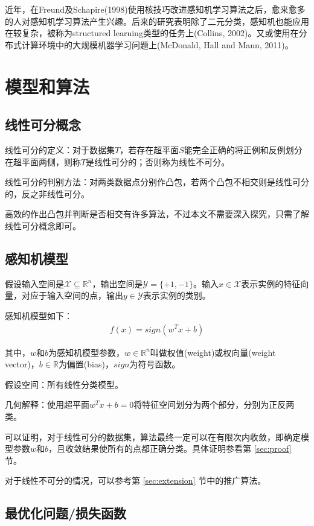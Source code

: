 \documentclass[a4paper,8pt]{article}
\begin{document}
近年，在Freund及Schapire(1998)使用核技巧改进感知机学习算法之后，愈来愈多的人对感知机学习算法产生兴趣。后来的研究表明除了二元分类，感知机也能应用在较复杂，被称为structured learning类型的任务上(Collins, 2002)。又或使用在分布式计算环境中的大规模机器学习问题上(McDonald, Hall and Mann, 2011)。

\section{模型和算法}

\subsection{线性可分概念}
线性可分的定义：对于数据集$T$，若存在超平面$S$能完全正确的将正例和反例划分在超平面两侧，则称$T$是线性可分的；否则称为线性不可分。

线性可分的判别方法：对两类数据点分别作凸包，若两个凸包不相交则是线性可分的，反之非线性可分。

高效的作出凸包并判断是否相交有许多算法，不过本文不需要深入探究，只需了解线性可分概念即可。

\subsection{感知机模型}
假设输入空间是$\mathcal{X} \subseteq \mathbb{R}^n$，输出空间是$ \mathcal{Y} = \{ +1,-1 \}$。输入$x\in \mathcal{X}$表示实例的特征向量，对应于输入空间的点，输出$y\in \mathcal{Y}$表示实例的类别。

感知机模型如下：
\begin{eqnarray}
f(x) = sign(w^T x + b)
\end{eqnarray}

其中，$w$和$b$为感知机模型参数，$w\in \mathbb{R}^n$叫做权值(weight)或权向量(weight vector)，$b\in \mathbb{R}$为偏置(bias)，$sign$为符号函数。

假设空间：所有线性分类模型。

几何解释：使用超平面$w^Tx+b=0$将特征空间划分为两个部分，分别为正反两类。

可以证明，对于线性可分的数据集，算法最终一定可以在有限次内收敛，即确定模型参数$w$和$b$，且收敛结果使所有的点都正确分类。具体证明参看第 \ref{sec:proof} 节。

对于线性不可分的情况，可以参考第 \ref{sec:extension} 节中的推广算法。

\subsection{最优化问题/损失函数}
\end{document}
